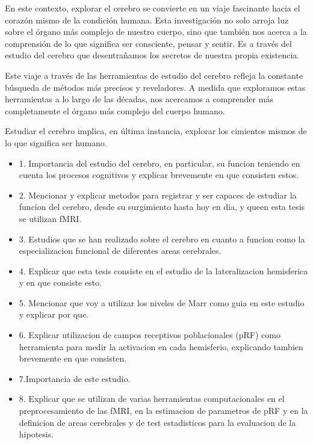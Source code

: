 \documentclass{article}
\begin{document}
	En este contexto, explorar el cerebro se convierte en un viaje fascinante hacia el corazón mismo de la condición humana. Esta investigación no solo arroja luz sobre el órgano más complejo de nuestro cuerpo, sino que también nos acerca a la comprensión de lo que significa ser consciente, pensar y sentir. Es a través del estudio del cerebro que desentrañamos los secretos de nuestra propia existencia.
	
	
	
	
	
	Este viaje a través de las herramientas de estudio del cerebro refleja la constante búsqueda de métodos más precisos y reveladores. A medida que exploramos estas herramientas a lo largo de las décadas, nos acercamos a comprender más completamente el órgano más complejo del cuerpo humano.
	
	Estudiar el cerebro implica, en última instancia, explorar los cimientos mismos de lo que significa ser humano.
	
	\begin{itemize}
		\item 1. Importancia del estudio del cerebro, en particular, su funcion teniendo en cuenta los procesos cognitivos y explicar brevemente en que consisten estos.
		\item 2. Mencionar y explicar metodos para registrar y ser capaces de estudiar la funcion del cerebro, desde su surgimiento hasta hoy en dia, y queen esta tesis se utilizan fMRI.
		\item 3. Estudios que se han realizado sobre el cerebro en cuanto a funcion como la especializacion funcional de diferentes areas cerebrales.
		\item 4. Explicar que esta tesis consiste en el estudio de la lateralizacion hemisferica y en que consiste esto.
		\item 5. Mencionar que voy a utilizar los niveles de Marr como guia en este estudio y explicar por que. 
		\item 6. Explicar utilizacion de campos receptivos poblacionales (pRF) como herramienta para medir la activacion en cada hemisferio, explicando tambien brevemente en que consisten. 
		\item 7.Importancia de este estudio.
		\item 8. Explicar que se utilizan de varias herramientas computacionales  en el preprocesamiento de las fMRI, en la estimacion de parametros de pRF y en la definicion de areas cerebrales y de test estadisticos para la evaluacion de la hipotesis.
	\end{itemize}
	
\end{document}
